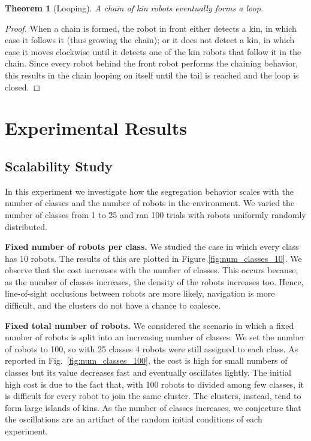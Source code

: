 \documentclass[letterpaper, 10 pt, conference]{ieeeconf}
\newtheorem{theorem}{Theorem}
\newcommand{\myparagraph}[1]{\textbf{#1.}}
\begin{document}
\begin{theorem}[Looping]
  A chain of kin robots eventually forms a loop.
\end{theorem}
\begin{proof}
  When a chain is formed, the robot in front either detects a kin, in which case
  it follows it (thus growing the chain); or it does not detect a kin, in which
  case it moves clockwise until it detects one of the kin robots that follow it
  in the chain. Since every robot behind the front robot performs the chaining
  behavior, this results in the chain looping on itself until the tail is
  reached and the loop is closed.
\end{proof}

\section{Experimental Results}

\subsection{Scalability Study} \label{section:scalability}

In this experiment we investigate how the segregation behavior scales with the
number of classes and the number of robots in the environment. We varied the
number of classes from 1 to 25 and ran 100 trials with robots uniformly randomly
distributed.

\myparagraph{Fixed number of robots per class}
We studied the case in which every class has 10 robots. The results of this are
plotted in Figure \ref{fig:num_classes_10}. We observe that the cost increases
with the number of classes. This occurs because, as the number of classes
increases, the density of the robots increases too. Hence, line-of-sight
occlusions between robots are more likely, navigation is more difficult, and the
clusters do not have a chance to coalesce.

\myparagraph{Fixed total number of robots}
We considered the scenario in which a fixed number of robots is split into an
increasing number of classes. We set the number of robots to 100, so with 25
classes 4 robots were still assigned to each class. As reported in
Fig.~\ref{fig:num_classes_100}, the cost is high for small numbers of classes
but its value decreases fast and eventually oscillates lightly. The initial high
cost is due to the fact that, with 100 robots to divided among few classes, it
is difficult for every robot to join the same cluster. The clusters, instead,
tend to form large islands of kins. As the number of classes increases, we
conjecture that the oscillations are an artifact of the random initial
conditions of each experiment.
\end{document}
